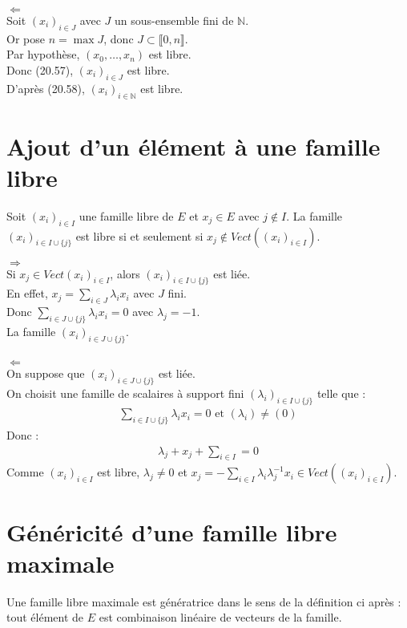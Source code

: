 \documentclass[../main.tex]{subfiles}
\begin{document}
$\boxed{\Leftarrow}$ \\
Soit $(x_i)_{i\in J}$ avec $J$ un sous-ensemble fini de $\mathbb{N}$. \\
Or pose $n = \max J$, donc $J \subset \llbracket 0, n \rrbracket$. \\
Par hypothèse, $(x_0, \ldots, x_n)$ est libre. \\
Donc (20.57), $(x_i)_{i\in J}$ est libre. \\
D'après (20.58), $(x_i)_{i\in \mathbb{N}}$ est libre. 

\section{Ajout d'un élément à une famille libre}
\begin{tcolorbox}[title=Propostion 20.61, title filled=false, colframe=lightblue, colback=lightblue!10!white]
    Soit $(x_i)_{i\in I}$ une famille libre de $E$ et $x_j \in E$ avec $j \not\in I$. La famille $(x_i)_{i\in I \cup \{j\}}$ est libre si et seulement si $x_j \not\in Vect((x_i)_{i\in I})$. 
\end{tcolorbox}

$\boxed{\Rightarrow}$ \\
Si $x_j \in Vect(x_i)_{i\in I}$, alors $(x_i)_{i\in I \cup \{j\}}$ est liée. \\
En effet, $x_j = \sum\limits_{i\in J} \lambda_i x_i$ avec $J$ fini. \\
Donc $\sum\limits_{i \in J\cup \{j\}} \lambda_i x_i = 0$ avec $\lambda_j = -1$. \\
La famille $(x_i)_{i\in J \cup \{j\}}$. \\ \\

$\boxed{\Leftarrow}$ \\
On suppose que $(x_i)_{i\in J \cup \{j\}}$ est liée. \\
On choisit une famille de scalaires à support fini $(\lambda_i)_{i\in I \cup \{j\}}$ telle que : 
\begin{align*}
    \sum_{i \in I \cup \{j\}} \lambda_i x_i = 0 \text{ et } (\lambda_i) \neq (0) 
\end{align*}
Donc : 
\begin{align*}
    \lambda_j + x_j + \sum_{i\in I} = 0 
\end{align*}
Comme $(x_i)_{i\in I}$ est libre, $\lambda_j \neq 0$ et $x_j = -\sum\limits_{i\in I} \lambda_i \lambda_j^{-1} x_i \in Vect((x_i)_{i\in I})$. 

\section{Généricité d'une famille libre maximale}
\begin{tcolorbox}[title=Propostion 20.63, title filled=false, colframe=lightblue, colback=lightblue!10!white]
    Une famille libre maximale est génératrice dans le sens de la définition ci après : tout élément de $E$ est combinaison linéaire de vecteurs de la famille. 
\end{tcolorbox}
\end{document}
